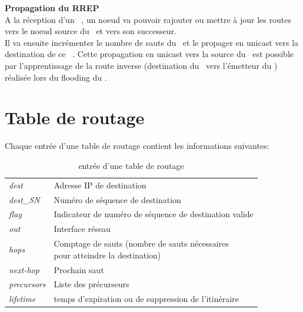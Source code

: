         \vspace{0.5cm}
        \textbf{Propagation du RREP}\\
            A la réception d'un \rrep\ , un noeud va pouvoir rajouter ou mettre à jour
            les routes vers le noeud source du \rrep\  et vers son successeur.\\
            Il va ensuite incrémenter le nombre de sauts du \rrep\  et le propager en unicast vers la destination de ce \rrep\ .
            Cette propagation en unicast vers la source du \rreq\ est possible par l'apprentissage de la route inverse
            (destination du \rreq\ vers l'émetteur du \rreq) réalisée lors du flooding du \rreq.

    \section{Table de routage}
        Chaque entrée d'une table de routage contient les informations suivantes:
        
        \begin{table}[H]
            \centering
            \begin{tabular}{|l|l|}
                \hline
                \textit{dest}       & Adresse IP de destination\\
                \textit{dest\_SN}   & Numéro de séquence de destination\\
                \textit{flag}       & Indicateur de numéro de séquence de destination valide\\
                \textit{out}        & Interface réseau\\
                \textit{hops}       & \makecell[l]{Comptage de sauts (nombre de sauts nécessaires\\ pour atteindre la destination)}\\
                \textit{next-hop}   & Prochain saut\\
                \textit{precursors} & Liste des précurseurs\\
                \textit{lifetime}   & temps d'expiration ou de suppression de l'itinéraire\\
                \hline
            \end{tabular}
            \caption{entrée d'une table de routage \aodv \cite{rfc_aodv}}
            \label{routingTable_aodv}
        \end{table}

